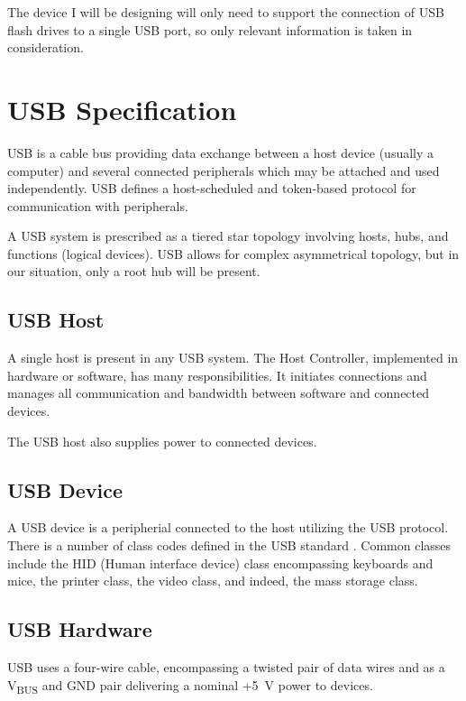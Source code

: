     The device I will be designing will only need to support the connection of USB flash drives to a single USB port, so only relevant information is taken in consideration.
    
    \section{USB Specification}
        USB is a cable bus providing data exchange between a host device (usually a computer) and several connected peripherals which may be attached and used independently.  USB defines a host-scheduled and token-based protocol for communication with peripherals.
        
        A USB system is prescribed as a tiered star topology involving hosts, hubs, and functions (logical devices).  USB allows for complex asymmetrical topology, but in our situation, only a root hub will be present.
        
        \subsection{USB Host}
            A single host is present in any USB system.  The Host Controller, implemented in hardware or software, has many responsibilities.  It initiates connections and manages all communication and bandwidth between software and connected devices.
            
            The USB host also supplies power to connected devices.
        
        \subsection{USB Device}
            A USB device is a peripherial connected to the host utilizing the USB protocol.  There is a number of class codes defined in the USB standard \cite{usb-class-codes}.  Common classes include the HID (Human interface device) class encompassing keyboards and mice, the printer class, the video class, and indeed, the mass storage class. 
        
        \subsection{USB Hardware}
            USB uses a four-wire cable, encompassing a twisted pair of data wires and as a V\textsubscript{BUS} and GND pair delivering a nominal +5~V power to devices.
            
